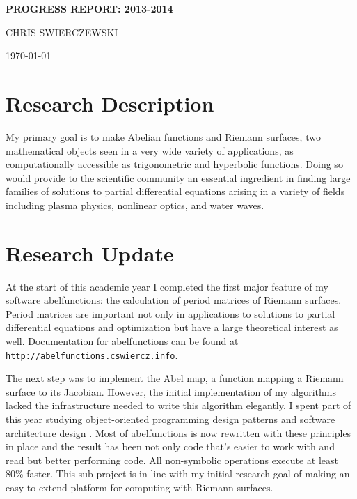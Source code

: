 \documentclass[11pt]{amsart}
\begin{document}
\begin{centering}
\large{\bf{PROGRESS REPORT: 2013-2014}}

\vspace{8pt}

CHRIS SWIERCZEWSKI

\vspace{8pt}

\today %

\vspace{8pt}

\end{centering}

\section*{Research Description}

My primary goal is to make Abelian functions and Riemann surfaces, two
mathematical objects seen in a very wide variety of applications, as
computationally accessible as trigonometric and hyperbolic
functions. Doing so would provide to the scientific community an
essential ingredient in finding large families of solutions to partial
differential equations arising in a variety of fields including plasma
physics, nonlinear optics, and water waves.

\section*{Research Update}

At the start of this academic year I completed the first major feature
of my software {\sc abelfunctions}: the calculation of period matrices
of Riemann surfaces. Period matrices are important not only in
applications to solutions to partial differential equations and
optimization but have a large theoretical interest as
well. Documentation for {\sc abelfunctions} can be found at {\tt
  http://abelfunctions.cswiercz.info}.

The next step was to implement the Abel map, a function mapping a
Riemann surface to its Jacobian. However, the initial implementation of
my algorithms lacked the infrastructure needed to write this algorithm
elegantly. I spent part of this year studying object-oriented
programming design patterns and software architecture design
\cite{Gamma1995, Martin2000}. Most of {\sc abelfunctions} is now
rewritten with these principles in place and the result has been not
only code that's easier to work with and read but better performing
code. All non-symbolic operations execute at least 80\% faster. This
sub-project is in line with my initial research goal of making an
easy-to-extend platform for computing with Riemann surfaces.
\end{document}
